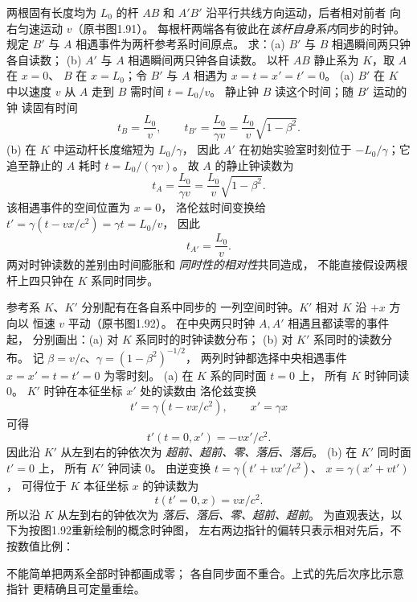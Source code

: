 两根固有长度均为 $L_0$ 的杆 $AB$
和 $A'B'$ 沿平行共线方向运动，后者相对前者
向右匀速运动 $v$（原书图1.91）。
每根杆两端各有彼此在\emph{该杆自身系内}同步的时钟。
规定 $B'$ 与 $A$ 相遇事件为两杆参考系时间原点。
求：(a) $B'$ 与 $B$ 相遇瞬间两只钟各自读数；
(b) $A'$ 与 $A$ 相遇瞬间两只钟各自读数。
\exsolution
以杆 $AB$ 静止系为 $K$，取 $A$ 在 $x=0$、
$B$ 在 $x=L_0$；令 $B'$ 与 $A$ 相遇为
$x=t=x'=t'=0$。
(a) $B'$ 在 $K$ 中以速度 $v$ 从 $A$ 走到 $B$
需时间 $t=L_0/v$。
静止钟 $B$ 读这个时间；随 $B'$ 运动的钟
读固有时间
\[
\boxed{t_B=\frac{L_0}{v}},\qquad
\boxed{t_{B'}=\frac{L_0}{\gamma v}
=\frac{L_0}{v}\sqrt{1-\beta^2}}.
\]
(b) 在 $K$ 中运动杆长度缩短为 $L_0/\gamma$，
因此 $A'$ 在初始实验室时刻位于
$-L_0/\gamma$；它追至静止的 $A$ 耗时
$t=L_0/(\gamma v)$。
故 $A$ 的静止钟读数为
\[
\boxed{t_A=\frac{L_0}{\gamma v}
=\frac{L_0}{v}\sqrt{1-\beta^2}}.
\]
该相遇事件的空间位置为 $x=0$，
洛伦兹时间变换给
$t'=\gamma(t-vx/c^2)=\gamma t=L_0/v$，
因此
\[
\boxed{t_{A'}=\frac{L_0}{v}}.
\]
\excheck 两对时钟读数的差别由时间膨胀和
\emph{同时性的相对性}共同造成，
不能直接假设两根杆上四只钟在 $K$ 系同时同步。

参考系 $K$、$K'$ 分别配有在各自系中同步的
一列空间时钟。$K'$ 相对 $K$ 沿 $+x$ 方向以
恒速 $v$ 平动（原书图1.92）。
在中央两只时钟 $A,A'$ 相遇且都读零的事件起，
分别画出：(a) 对 $K$ 系同时的时钟读数分布；
(b) 对 $K'$ 系同时的读数分布。
\exsolution
记 $\beta=v/c$、$\gamma=(1-\beta^2)^{-1/2}$，
两列时钟都选择中央相遇事件
$x=x'=t=t'=0$ 为零时刻。
(a) 在 $K$ 系的同时面 $t=0$ 上，
所有 $K$ 时钟同读 $0$。
$K'$ 时钟在本征坐标 $x'$ 处的读数由
洛伦兹变换
\[
t'=\gamma(t-vx/c^2),\qquad x'=\gamma x
\]
可得
\[
\boxed{t'(t=0,x')=-vx'/c^2}.
\]
因此沿 $K'$ 从左到右的钟依次为
\emph{超前、超前、零、落后、落后}。
(b) 在 $K'$ 同时面 $t'=0$ 上，
所有 $K'$ 钟同读 $0$。
由逆变换
$t=\gamma(t'+vx'/c^2)$、
$x=\gamma(x'+vt')$，
可得位于 $K$ 本征坐标 $x$ 的钟读数为
\[
\boxed{t(t'=0,x)=vx/c^2}.
\]
所以沿 $K$ 从左到右的钟依次为
\emph{落后、落后、零、超前、超前}。
为直观表达，以下为按图1.92重新绘制的概念时钟图，
左右两边指针的偏转只表示相对先后，不按数值比例：
\begin{center}
\end{center}
\excheck 不能简单把两系全部时钟都画成零；
各自同步面不重合。上式的先后次序比示意指针
更精确且可定量重绘。

